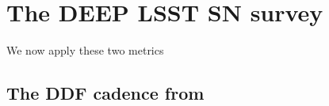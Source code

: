 \documentclass[\docopts]{\docclass}
\begin{document}
\section{The DEEP LSST SN survey}
\label{sec:ddf_cadence}
We now apply these two metrics 

\subsection{The DDF cadence from }
\label{sec:results}




\begin{figure}
\begin{center}
\\

\end{center}
\end{figure}
\end{document}
